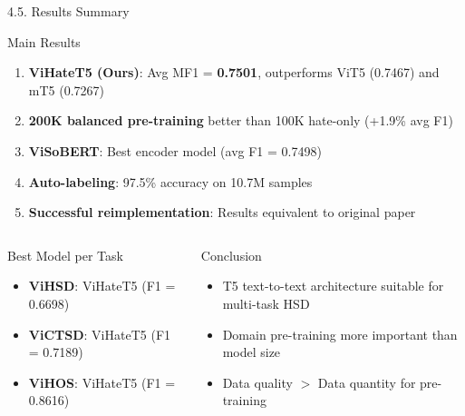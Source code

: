 \documentclass[11pt, aspectratio=169]{beamer}
\begin{document}
\begin{frame}[fragile, shrink=15]{4.5. Results Summary}

\begin{block}{Main Results}
  \begin{enumerate}
    \item \textbf{ViHateT5 (Ours)}: Avg MF1 = \textbf{0.7501}, outperforms ViT5 (0.7467) and mT5 (0.7267)
    \item \textbf{200K balanced pre-training} better than 100K hate-only (+1.9\% avg F1)
    \item \textbf{ViSoBERT}: Best encoder model (avg F1 = 0.7498)
    \item \textbf{Auto-labeling}: 97.5\% accuracy on 10.7M samples
    \item \textbf{Successful reimplementation}: Results equivalent to original paper
  \end{enumerate}
\end{block}

\vspace{0.3cm}
\begin{columns}[T]
  \begin{block}{Best Model per Task}
    \begin{itemize}
      \item \textbf{ViHSD}: ViHateT5 (F1 = 0.6698)
      \item \textbf{ViCTSD}: ViHateT5 (F1 = 0.7189)
      \item \textbf{ViHOS}: ViHateT5 (F1 = 0.8616)
    \end{itemize}
  \end{block}

  \begin{block}{Conclusion}
    \begin{itemize}
      \item T5 text-to-text architecture suitable for multi-task HSD
      \item Domain pre-training more important than model size
      \item Data quality $>$ Data quantity for pre-training
    \end{itemize}
  \end{block}
\end{columns}
\end{frame}
\end{document}
